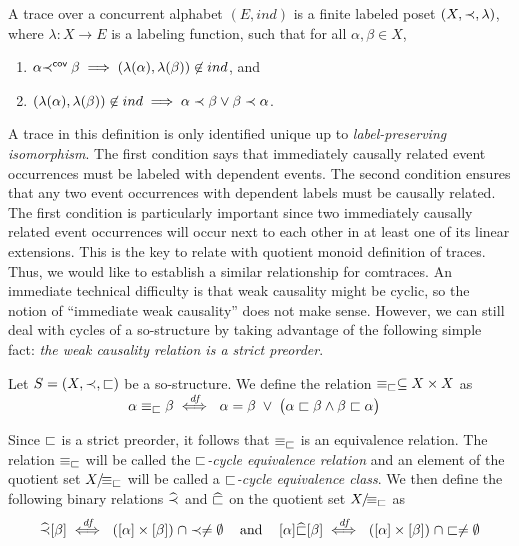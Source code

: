 \documentclass{llncs}
\begin{document}
\begin{definition}[cf. \cite{TW02}] A trace over a concurrent alphabet $(E,ind)$ is a finite labeled poset $(X,\prec,\lambda)$, where $\lambda:X\rightarrow E$ is a labeling function, such that for all $\alpha,\beta \in X$,
\begin{enumerate}
\item $\alpha {\prec}^{\mathsf{cov}\;} \beta \implies (\lambda(\alpha),\lambda(\beta))\not \in ind$, and
\item $(\lambda(\alpha),\lambda(\beta))\not \in ind \implies \alpha \prec \beta \vee \beta \prec \alpha$. \EOD
\end{enumerate}
\label{def:ltraces}
\end{definition}

A trace in this definition is only identified unique up to  \emph{label-preserving isomorphism}. The first condition says that immediately causally related event occurrences  must be labeled with dependent events. The second condition ensures that any two event occurrences with dependent labels must be causally related.  The first condition is particularly important since two immediately causally related event occurrences will occur next to each other in at least one of its linear extensions. This is the key to relate   with quotient monoid definition of traces. Thus, we would like to establish a similar relationship for  comtraces. An immediate technical difficulty  is that weak causality might be cyclic, so the notion of ``immediate weak causality''  does not make sense. However, we can still deal with cycles of a so-structure by taking advantage of  the following simple fact: \emph{the weak causality relation is a strict preorder}.

Let $S=(X,\prec,\sqsubset)$ be a so-structure. We define the relation $\equiv_{\sqsubset}\subseteq X\times X$ as\\
$\mbox{\hspace{3cm}}\alpha \eqrel{\sq} \beta \iffdf \alpha=\beta \;\vee\; \bigl(\alpha\sq \beta \wedge \beta \sq \alpha\bigr)$

Since $\sqsubset$ is a strict preorder, it follows that $\equiv_{\sqsubset}$ is an equivalence relation. The relation $\equiv_{\sqsubset}$ will be called the \emph{$\sqsubset$-cycle equivalence relation} and an element of the quotient set ${X}/\!{\equiv_{\sqsubset}}$ will be called a \emph{$\sqsubset$-cycle equivalence class}.  We then define the following binary relations $\widehat{\prec}$ and $\widehat{\sqsubset}$ on  the quotient set ${X}/\!{\equiv_{\sqsubset}}$ as
\begin{align}
[\alpha] \widehat{\PO} [\beta] \iffdf ([\alpha]\times[\beta])\;\cap \PO \not=\emptyset
\hspace*{3mm}\text{ and }\hspace*{3mm}
[\alpha] \widehat{\sq} [\beta] \iffdf ([\alpha]\times[\beta])\;\cap \sq \not=\emptyset \label{qsos}
\end{align}
\end{document}
